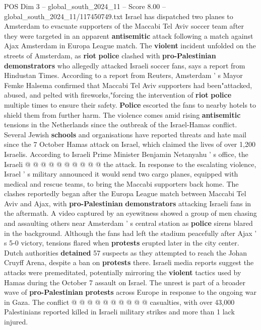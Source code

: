 \begin{textsample}{POS Dim 3 – global\_south\_2024\_11 – Score 8.00 – global\_south\_2024\_11/117450749.txt}  \label{ex:f3_pos_326}
Israel has dispatched two planes to Amsterdam to evacuate supporters of the Maccabi Tel Aviv soccer team after they were targeted in an apparent \textbf{antisemitic} attack following a match against Ajax Amsterdam in Europa League match.
The \textbf{violent} incident unfolded on the streets of Amsterdam, as \textbf{riot} \textbf{police} clashed with \textbf{pro-Palestinian} \textbf{demonstrators} who allegedly attacked Israeli soccer fans, says a report from Hindustan Times.
According to a report from Reuters, Amsterdam ' s Mayor Femke Halsema confirmed that Maccabi Tel Aviv supporters had been"attacked, abused, and pelted with fireworks,"forcing the intervention of \textbf{riot} \textbf{police} multiple times to ensure their safety. \textbf{Police} escorted the fans to nearby hotels to shield them from further harm.
The violence comes amid rising \textbf{antisemitic} tensions in the Netherlands since the outbreak of the Israel-Hamas conflict.
Several Jewish \textbf{schools} and organisations have reported threats and hate mail since the 7 October Hamas attack on Israel, which claimed the lives of over 1,200 Israelis.
According to Israeli Prime Minister Benjamin Netanyahu ' s office, the Israeli @ @ @ @ @ @ @ @ @ @ the attack.
In response to the escalating violence, Israel ' s military announced it would send two cargo planes, equipped with medical and rescue teams, to bring the Maccabi supporters back home.
The clashes reportedly began after the Europa League match between Maccabi Tel Aviv and Ajax, with \textbf{pro-Palestinian} \textbf{demonstrators} attacking Israeli fans in the aftermath.
A video captured by an eyewitness showed a group of men chasing and assaulting others near Amsterdam ' s central station as \textbf{police} sirens blared in the background.
Although the fans had left the stadium peacefully after Ajax ' s 5-0 victory, tensions flared when \textbf{protests} erupted later in the city center.
Dutch authorities \textbf{detained} 57 suspects as they attempted to reach the Johan Cruyff Arena, despite a ban on \textbf{protests} there.
Israeli media reports suggest the attacks were premeditated, potentially mirroring the \textbf{violent} tactics used by Hamas during the October 7 assault on Israel.
The unrest is part of a broader wave of \textbf{pro-Palestinian} \textbf{protests} across Europe in response to the ongoing war in Gaza.
The conflict @ @ @ @ @ @ @ @ @ @ casualties, with over 43,000 Palestinians reported killed in Israeli military strikes and more than 1 lack injured.

\end{textsample}
